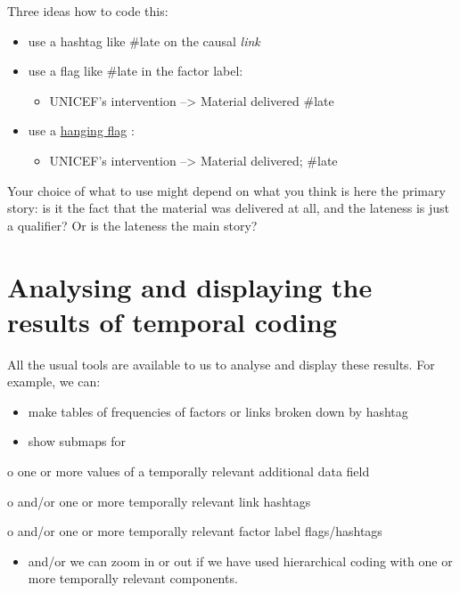 \documentclass[
]{book}
\providecommand{\tightlist}{%
  \setlength{\itemsep}{0pt}\setlength{\parskip}{0pt}}
\begin{document}
Three ideas how to code this:

\begin{itemize}
\tightlist
\item
  use a hashtag like \#late on the causal \emph{link}
\item
  use a flag like \#late in the factor label:

  \begin{itemize}
  \tightlist
  \item
    UNICEF's intervention --\textgreater{} Material delivered \#late
  \end{itemize}
\item
  use a \protect\hyperlink{hanging-flags}{hanging flag} :

  \begin{itemize}
  \tightlist
  \item
    UNICEF's intervention --\textgreater{} Material delivered; \#late
  \end{itemize}
\end{itemize}

Your choice of what to use might depend on what you think is here the primary story: is it the fact that the material was delivered at all, and the lateness is just a qualifier? Or is the lateness the main story?

\hypertarget{analysing-and-displaying-the-results-of-temporal-coding}{%
\section{Analysing and displaying the results of temporal coding}\label{analysing-and-displaying-the-results-of-temporal-coding}}

All the usual tools are available to us to analyse and display these results. For example, we can:

\begin{itemize}
\item
  make tables of frequencies of factors or links broken down by hashtag
\item
  show submaps for
\end{itemize}

o one or more values of a temporally relevant additional data field

o and/or one or more temporally relevant link hashtags

o and/or one or more temporally relevant factor label flags/hashtags

\begin{itemize}
\tightlist
\item
  and/or we can zoom in or out if we have used hierarchical coding with one or more temporally relevant components.
\end{itemize}
\end{document}

